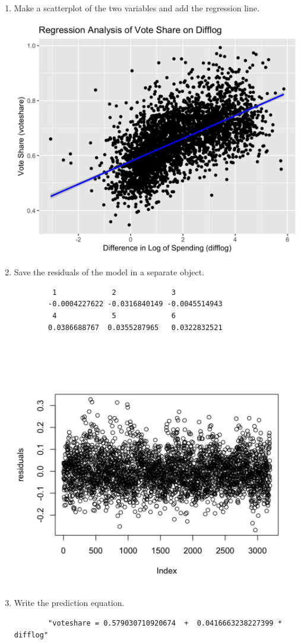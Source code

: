 \documentclass[12pt,letterpaper]{article}
\begin{document}
\begin{enumerate}
		
		\item Make a scatterplot of the two variables and add the regression line. 	
		  
		\includegraphics[width=.80\textwidth]{Scatterplot_1.2.png}
		
		\item Save the residuals of the model in a separate object.	
		  
	
			\begin{verbatim}
		 1             2             3            
		-0.0004227622 -0.0316840149 -0.0045514943  
		 4             5             6 
		0.0386688767  0.0355287965   0.0322832521 
		
			\end{verbatim}	
		\includegraphics[width=.80\textwidth]{Scatterplot_1.3.png}
		\item Write the prediction equation.
		  
		\begin{verbatim}
		"voteshare = 0.579030710920674  +  0.0416663238227399 * difflog"
	\end{verbatim}	
	\end{enumerate}
	
\end{document}
